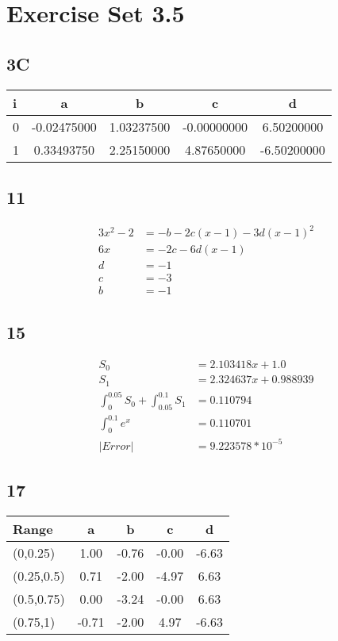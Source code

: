 \documentclass{oisinclass}
\begin{document}
\section*{Exercise Set 3.5}
\subsection*{3C}
\begin{tabular}{l|cccc}
	i & a           & b          & c           & d           \\
	\toprule{}
	0 & -0.02475000 & 1.03237500 & -0.00000000 & 6.50200000  \\
	1 & 0.33493750  & 2.25150000 & 4.87650000  & -6.50200000
\end{tabular}
\subsection*{11}
\begin{align*}
	3 x^{2} - 2 & = - b - 2 c \left(x - 1\right) - 3 d \left(x - 1\right)^{2} \\
	6 x         & = - 2 c - 6 d \left(x - 1\right)                            \\
	d           & = -1                                                        \\
	c           & = -3                                                        \\
	b           & = -1
\end{align*}
\subsection*{15}
\begin{align*}
	S_0                                        & = 2.103418 x + 1.0      \\
	S_1                                        & = 2.324637 x + 0.988939 \\
	\int_{0}^{0.05}S_0 + \int_{0.05}^{0.1} S_1 & = 0.110794              \\
	\int_{0}^{0.1} e^x                         & = 0.110701              \\
	|Error|                                    & = 9.223578 * 10^{-5}
\end{align*}
\subsection*{17}

\begin{tabular}{l|cccc}
	Range      & a     & b     & c     & d     \\
	\toprule{}
	(0,0.25)   & 1.00  & -0.76 & -0.00 & -6.63 \\
	(0.25,0.5) & 0.71  & -2.00 & -4.97 & 6.63  \\
	(0.5,0.75) & 0.00  & -3.24 & -0.00 & 6.63  \\
	(0.75,1)   & -0.71 & -2.00 & 4.97  & -6.63
\end{tabular}
\end{document}
